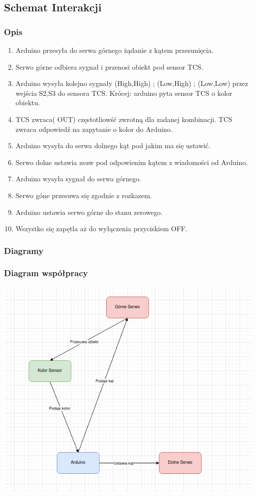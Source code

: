 \documentclass[12pt]{article}
\begin{document}
\subsection{Schemat Interakcji}
\subsubsection{Opis}
\begin{enumerate}

\item Arduino przesyła do serwa górnego żądanie z kątem przesunięcia. \item Serwo górne odbiera sygnał i przenosi obiekt pod sensor TCS.\item  Arduino wysyła kolejno sygnały (High,High) ; (Low,High) ; (Low,Low)  przez wejścia S2,S3 do sensora TCS. Krócej: arduino pyta sensor TCS o kolor obiektu. \item TCS zwraca( OUT) częstotliowść zwrotną dla zadanej kombinacji. TCS zwraca odpowiedź na zapytanie o kolor do Arduino.\item  Arduino wysyła do serwa dolnego kąt pod jakim ma się ustawić. \item Serwo dolne ustawia zsuw pod odpowienim kątem z wiadomości od Arduino. \item Arduino wysyła sygnał do serwa górnego. \item Serwo góne przesuwa się zgodnie z rozkazem. \item Arduino ustawia serwo górne do stanu zerowego.\item  Wszystko się zapętla aż do wyłączenia przyciskiem OFF.
\end{enumerate}
\subsubsection{Diagramy}
\subsubsection{Diagram współpracy}
\hspace{-2.75cm}%
    \includegraphics[scale=0.8]{wspol.png}
\end{document}
